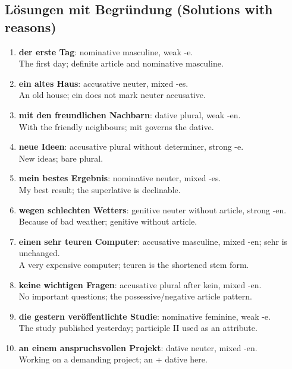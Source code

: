 \documentclass[a4paper,11pt]{article}
\begin{document}
\subsection{Lösungen mit Begründung \textnormal{(Solutions with reasons)}}
\begin{enumerate}
\item \textbf{der erste Tag}: nominative masculine, weak -e.\\{\small\color{SoftGray}The first day; definite article and nominative masculine.}
\item \textbf{ein altes Haus}: accusative neuter, mixed -es.\\{\small\color{SoftGray}An old house; ein does not mark neuter accusative.}
\item \textbf{mit den freundlichen Nachbarn}: dative plural, weak -en.\\{\small\color{SoftGray}With the friendly neighbours; mit governs the dative.}
\item \textbf{neue Ideen}: accusative plural without determiner, strong -e.\\{\small\color{SoftGray}New ideas; bare plural.}
\item \textbf{mein bestes Ergebnis}: nominative neuter, mixed -es.\\{\small\color{SoftGray}My best result; the superlative is declinable.}
\item \textbf{wegen schlechten Wetters}: genitive neuter without article, strong -en.\\{\small\color{SoftGray}Because of bad weather; genitive without article.}
\item \textbf{einen sehr teuren Computer}: accusative masculine, mixed -en; sehr is unchanged.\\{\small\color{SoftGray}A very expensive computer; teuren is the shortened stem form.}
\item \textbf{keine wichtigen Fragen}: accusative plural after kein, mixed -en.\\{\small\color{SoftGray}No important questions; the possessive/negative article pattern.}
\item \textbf{die gestern veröffentlichte Studie}: nominative feminine, weak -e.\\{\small\color{SoftGray}The study published yesterday; participle II used as an attribute.}
\item \textbf{an einem anspruchsvollen Projekt}: dative neuter, mixed -en.\\{\small\color{SoftGray}Working on a demanding project; an + dative here.}
\end{enumerate}
\end{document}
